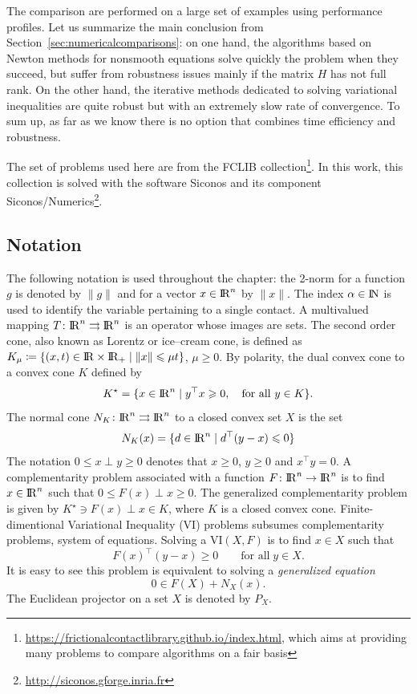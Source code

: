 The comparison are performed on a large set of examples using performance profiles.
{Let us summarize the main conclusion from Section~\ref{sec:numericalcomparisons}:
on one hand}, the algorithms based on Newton methods for nonsmooth equations solve quickly the problem when they succeed, but suffer from robustness issues mainly if the matrix $H$ has not full rank. On the other hand, the
iterative methods dedicated to solving variational inequalities are quite robust but with an extremely slow rate of convergence. To sum up, as far as we know there is no option that combines time efficiency and robustness.
{The set of problems used here are from the FCLIB collection\footnote{\url{https://frictionalcontactlibrary.github.io/index.html}, which aims at providing many problems to compare algorithms on a fair basis}.  In this work, this collection is solved with the software {\sc Siconos} and its component {\sc Siconos/Numerics}\footnote{\url{http://siconos.gforge.inria.fr}}\citep{Acary.Bremond.Huber.Perignon2015}.

\subsection{Notation}

The following notation is used throughout the chapter: the 2-norm for a function $g$ is denoted  by $\|g\|$ and for a vector $x\in\mathrm{I\!R}^n$ by $\|x\|$. 
The index $\alpha\in\mathrm{I\!N}$ is used to identify the variable pertaining to a single contact.
A multivalued mapping $T\colon\mathrm{I\!R}^n\rightrightarrows\mathrm{I\!R}^n$ is an operator whose images are sets.
The second order cone, also known as Lorentz or ice--cream cone, is defined as $K_\mu \coloneqq\{(x, t)\in\mathrm{I\!R}\times\mathrm{I\!R}_+\mid \|x\|\leqslant \mu t\}$, $\mu\geq0$.
By polarity, the dual convex cone to a convex cone $K$ defined by
\begin{equation}
  \label{eq:dual-cone}
  K^\star = \{x \in \RR^n \mid  y^\top x \geq 0, \quad \text{for all } y \in K\}.
\end{equation}
The normal cone $N_K\colon\mathrm{I\!R}^n\rightrightarrows\mathrm{I\!R}^n$ to a closed convex set $X$ is the set
\begin{equation}
 N_K(x) = \{d\in\mathrm{I\!R}^n\mid d^\top(y - x) \leqslant 0\}
\end{equation}
The notation $0\leq x\perp y\geq 0$ denotes that $x\geq0$, $y\geq0$ and $x^\top y = 0$.
A complementarity problem associated with a function $F\colon \mathrm{I\!R}^n\to\mathrm{I\!R}^n$ is to find $x\in\mathrm{I\!R}^n$ such that $0\leq F(x) \perp x \geq 0$.
The generalized complementarity problem is given by $K^\star\ni F(x) \perp x \in K$, where $K$ is a closed convex cone.
Finite-dimentional Variational Inequality (VI) problems subsumes complementarity problems, system of equations.
Solving a $\mathrm{VI}(X,F)$ is to find $x\in X$ such that
%
\begin{equation}
 F(x)^\top(y - x)\geq 0\qquad\text{for all}\; y\in X.
\end{equation}
%
It is easy to see this problem is equivalent to solving a \emph{generalized equation}
\begin{equation}
 0 \in F(X) + N_X(x).
\end{equation}
The Euclidean projector on a set $X$ is denoted by $P_X$.



}

